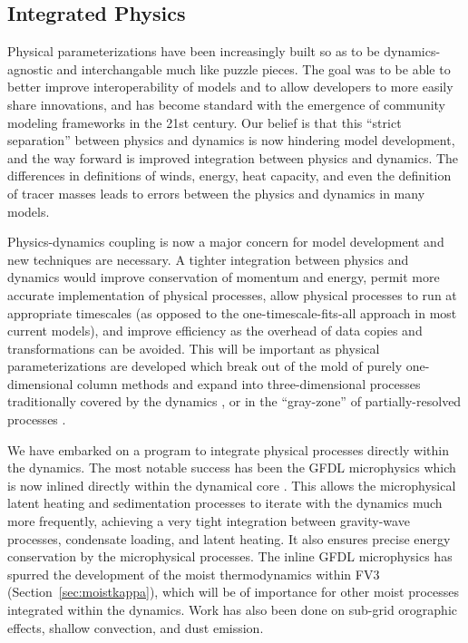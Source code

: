 \documentclass[10pt,letterpaper,margin=1in]{memoir}
\begin{document}
\subsection{Integrated Physics}

Physical parameterizations have been increasingly built so as to be dynamics-agnostic and interchangable \citep{kalnay1989rules} much like puzzle pieces. The goal was to be able to better improve interoperability of models and to allow developers to more easily share innovations, and has become standard with the emergence of community modeling frameworks in the 21st century. Our belief is that this ``strict separation'' between physics and dynamics is now hindering model development, and the way forward is improved integration between physics and dynamics. The differences in definitions of winds, energy, heat capacity, and even the definition of tracer masses leads to errors between the physics and dynamics in many models. 

Physics-dynamics coupling is now a major concern for model development \citep{gross2018physics} and new techniques are necessary. A tighter integration between physics and dynamics would improve conservation of momentum and energy, permit more accurate implementation of physical processes, allow physical processes to run at appropriate timescales (as opposed to the one-timescale-fits-all approach in most current models), and improve efficiency as the overhead of data copies and transformations can be avoided. This will be important as physical parameterizations are developed which break out of the mold of purely one-dimensional column methods and expand into three-dimensional processes traditionally covered by the dynamics \citep{grandpeix2010density,lee2011parameterization}, or in the ``gray-zone'' of partially-resolved processes \citep{malardel2019coupling}.


We have embarked on a program to integrate physical processes directly within the dynamics. The most notable success has been the GFDL microphysics \citep{ChenLin2013,Zhou2019} which is now inlined directly within the dynamical core \citep{Harris2020}. This allows the microphysical latent heating and sedimentation processes to iterate with the dynamics much more frequently, achieving a very tight integration between gravity-wave processes, condensate loading, and latent heating. It also ensures precise energy conservation by the microphysical processes. The inline GFDL microphysics has spurred the development of the moist thermodynamics within FV3 (Section~\ref{sec:moistkappa}), which will be of importance for other moist processes integrated within the dynamics. Work has also been done on sub-grid orographic effects, shallow convection, and dust emission.
\end{document}
